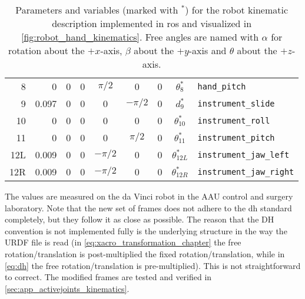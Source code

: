 \begin{table}[H]
{\begin{tabular}{r | rrr | ccc | c l}
		8 & 0 & 0 & 0 & $\pi/2$ & 0 & 0 & $\theta_8^*$ & \texttt{hand\_pitch} \\
		9 & 0.097 & 0 & 0 & 0 & $-\pi/2$ &  0 & $d_9^*$ & \texttt{instrument\_slide} \\
		10 & 0 & 0 & 0 & 0 & 0 & 0 & $\theta_{10}^*$ & \texttt{instrument\_roll} \\
		11 & 0 & 0 & 0 & 0 & $\pi/2$ & 0 & $\theta_{11}^*$ & \texttt{instrument\_pitch} \\
		12L & 0.009 & 0 & 0 & $-\pi/2$ & 0 & 0 & $\theta_{12L}^*$ & \texttt{instrument\_jaw\_left} \\
		12R & 0.009 & 0 & 0 & $-\pi/2$ & 0 & 0 & $\theta_{12R}^*$ & \texttt{instrument\_jaw\_right} \\
		\end{tabular}\label{tab:new_kin_short}}
	\caption{Parameters and variables (marked with $^*$) for the robot kinematic description implemented in \gls{ros} and visualized in \autoref{fig:robot_hand_kinematics}. Free angles are named with $\alpha$ for rotation about the $+x$-axis, $\beta$ about the $+y$-axis and $\theta$ about the $+z$-axis.}
	\label{tab:xacro_param_short}
\end{table}
The values are measured on the da Vinci robot in the AAU control and surgery laboratory. %
Note that the new set of frames does not adhere to the \gls{dh} standard completely, but they follow it as close as possible. The reason that the DH convention is not implemented fully is the underlying structure in the way the URDF file is read (in \autoref{eq:xacro_transformation_chapter} the free rotation/translation is post-multiplied the fixed rotation/translation, while in \autoref{eq:dh} the free rotation/translation is pre-multiplied). This is not straightforward to correct. The modified frames are tested and verified in \autoref{sec:app_activejoints_kinematics}.

